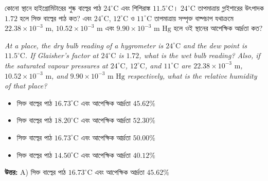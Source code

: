 \documentclass[12pt, a4paper]{article}
\begin{document}
\begin{tcolorbox}[questionbox={প্রশ্ন (Question) 6}]
    \noindent
    কোনো স্থানে হাইগ্রোমিটারের শুষ্ক বাল্বের পাঠ $24^\circ\text{C}$ এবং শিশিরাঙ্ক $11.5^\circ\text{C}$। $24^\circ\text{C}$ তাপমাত্রায় গ্লাইশারের উৎপাদক $1.72$ হলে সিক্ত বাল্বের পাঠ কত? এবং $24^\circ\text{C}$, $12^\circ\text{C}$ ও $11^\circ\text{C}$ তাপমাত্রায় সম্পৃক্ত বাষ্পচাপ যথাক্রমে $22.38 \times 10^{-3}\text{ m}$, $10.52 \times 10^{-3}\text{ m}$ এবং $9.90 \times 10^{-3}\text{ m Hg}$ হলে ওই স্থানের আপেক্ষিক আর্দ্রতা কত?
    
    \vspace{0.8em}
    \begin{english}
    \noindent\textit{\color{darkgray}
    At a place, the dry bulb reading of a hygrometer is $24^\circ\text{C}$ and the dew point is $11.5^\circ\text{C}$. If Glaisher's factor at $24^\circ\text{C}$ is $1.72$, what is the wet bulb reading? Also, if the saturated vapour pressures at $24^\circ\text{C}$, $12^\circ\text{C}$, and $11^\circ\text{C}$ are $22.38 \times 10^{-3}\text{ m}$, $10.52 \times 10^{-3}\text{ m}$, and $9.90 \times 10^{-3}\text{ m Hg}$ respectively, what is the relative humidity of that place?
    }
    \end{english}
\end{tcolorbox}

\begin{itemize}[label={}, leftmargin=1cm, itemsep=0.5em]
    \item[\textbf{A)}] সিক্ত বাল্বের পাঠ $16.73^\circ\text{C}$ এবং আপেক্ষিক আর্দ্রতা $45.62\%$
    \item[\textbf{B)}] সিক্ত বাল্বের পাঠ $18.20^\circ\text{C}$ এবং আপেক্ষিক আর্দ্রতা $52.30\%$
    \item[\textbf{C)}] সিক্ত বাল্বের পাঠ $16.73^\circ\text{C}$ এবং আপেক্ষিক আর্দ্রতা $50.00\%$
    \item[\textbf{D)}] সিক্ত বাল্বের পাঠ $14.50^\circ\text{C}$ এবং আপেক্ষিক আর্দ্রতা $40.12\%$
\end{itemize}

\vspace{0.5em}
\begin{tcolorbox}[answerbox]
    \textbf{\color{success} উত্তর:} A) সিক্ত বাল্বের পাঠ $16.73^\circ\text{C}$ এবং আপেক্ষিক আর্দ্রতা $45.62\%$
\end{tcolorbox}
\vspace{1em}
\end{document}
